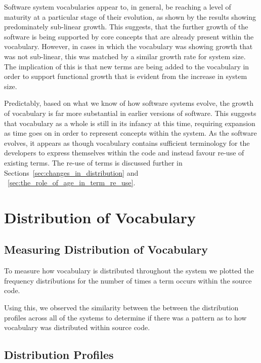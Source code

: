 Software system vocabularies appear to, in general, be reaching a level of maturity at a particular stage of their evolution, as shown by the results showing predominately sub-linear growth. This suggests, that the further growth of the software is being supported by core concepts that are already present within the vocabulary. However, in cases in which the vocabulary was showing growth that was not sub-linear, this was matched by a similar growth rate for system size. The implication of this is that new terms are being added to the vocabulary in order to support functional growth that is evident from the increase in system size.

Predictably, based on what we know of how software systems evolve, the growth of vocabulary is far more substantial in earlier versions of software. This suggests that vocabulary as a whole is still in its infancy at this time, requiring expansion as time goes on in order to represent concepts within the system. As the software evolves, it appears as though vocabulary contains sufficient terminology for the developers to express themselves within the code and instead favour re-use of existing terms. The re-use of terms is discussed further in Sections~\ref{sec:changes_in_distribution} and ~\ref{sec:the_role_of_age_in_term_re_use}.

\section{Distribution of Vocabulary} %
\label{sec:distribution_of_vocabulary}

\subsection{Measuring Distribution of Vocabulary} %
\label{sub:measuring_distribution_of_vocabulary}

To measure how vocabulary is distributed throughout the system we plotted the frequency distributions for the number of times a term occurs within the source code.

Using this, we observed the similarity between the between the distribution profiles across all of the systems to determine if there was a pattern as to how vocabulary was distributed within source code.


\subsection{Distribution Profiles} %
\label{sub:distribution_profiles}

